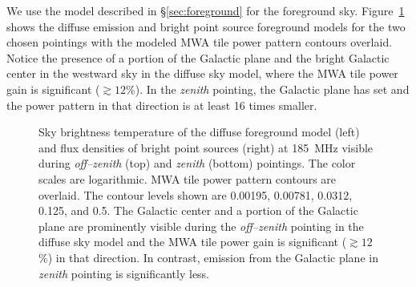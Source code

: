 \documentclass[preprint2,iop,numberedappendix,twocolappendix,appendixfloats]{emulateapj}
\begin{document}
We use the model described in \S\ref{sec:foreground} for the foreground sky. Figure~\ref{fig:sky-model-MWA} shows the diffuse emission and bright point source foreground models for the two chosen pointings with the modeled MWA tile power pattern contours overlaid. Notice the presence of a portion of the Galactic plane and the bright Galactic center in the westward sky in the diffuse sky model, where the MWA tile power gain is significant ($\gtrsim 12$\%). In the {\it zenith} pointing, the Galactic plane has set and the power pattern in that direction is at least 16 times smaller. 

\begin{figure}[htb]
\centering
\caption{Sky brightness temperature of the diffuse foreground model (left) and flux densities of bright point sources (right) at 185~MHz visible during {\it off--zenith} (top) and {\it zenith} (bottom) pointings. The color scales are logarithmic. MWA tile power pattern contours are overlaid. The contour levels shown are 0.00195, 0.00781, 0.0312, 0.125, and 0.5. The Galactic center and a portion of the Galactic plane are prominently visible during the {\it off--zenith} pointing in the diffuse sky model and the MWA tile power gain is significant ($\gtrsim 12$\%) in that direction. In contrast, emission from the Galactic plane in {\it zenith} pointing is significantly less.}
\label{fig:sky-model-MWA}
\end{figure}
\end{document}
